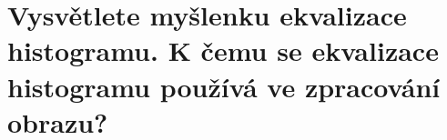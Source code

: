 \section{Vysvětlete myšlenku ekvalizace histogramu. K čemu se ekvalizace histogramu používá ve zpracování obrazu?}